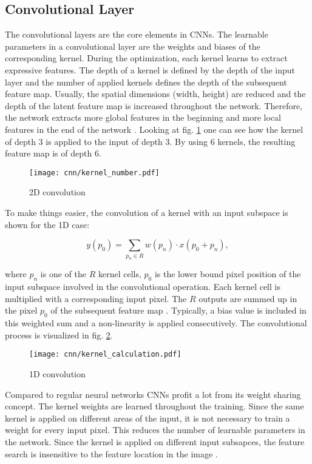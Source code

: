 \subsection{Convolutional Layer}
The convolutional layers are the core elements in CNNs. The learnable parameters in a convolutional layer are the weights and biases of the corresponding kernel. During the optimization, each kernel learns to extract expressive features. The depth of a kernel is defined by the depth of the input layer and the number of applied kernels defines the depth of the subsequent feature map. Usually, the spatial dimensions (width, height) are reduced and the depth of the latent feature map is increased throughout the network. Therefore, the network extracts more global features in the beginning and more local features in the end of the network \cite{OShea2015}. Looking at fig. \ref{fig:kernel_number} one can see how the kernel of depth 3 is applied to the input of depth 3. By using 6 kernels, the resulting feature map is of depth 6.

\begin{figure}[H]
  \centering
  \texttt{[image: cnn/kernel\_number.pdf]}
  \caption {2D convolution}
  \label{fig:kernel_number}
\end{figure}

To make things easier, the convolution of a kernel with an input subspace is shown for the 1D case:

\begin{equation}
  y(p_{0}) = \sum_{p_{n} \in R} w(p_{n}) \cdot x(p_{0} + p_{n}), 
  \label{eq:kernel}
\end{equation}

where $p_{n}$ is one of the $R$ kernel cells, $p_{0}$ is the lower bound pixel position of the input subspace involved in the convolutional operation. Each kernel cell is multiplied with a corresponding input pixel. The $R$ outputs are summed up in the pixel $p_{0}$ of the subsequent feature map \cite{Dai2017}. Typically, a bias value is included in this weighted sum and a non-linearity is applied consecutively. The convolutional process is visualized in fig. \ref{fig:kernel}.


\begin{figure}[H]
  \centering
  \texttt{[image: cnn/kernel\_calculation.pdf]}
  \caption {1D convolution}
  \label{fig:kernel}
\end{figure}

Compared to regular neural networks CNNs profit a lot from its weight sharing concept. The kernel weights are learned throughout the training. Since the same kernel is applied on different areas of the input, it is not necessary to train a weight for every input pixel. This reduces the number of learnable parameters in the network. Since the kernel is applied on different input subsapces, the feature search is insensitive to the feature location in the image \cite{OShea2015}.

